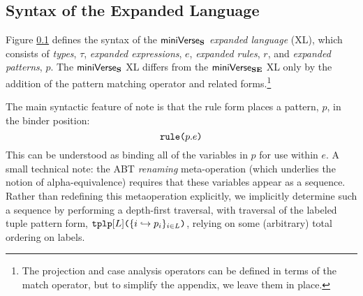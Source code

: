 {{{{\subsection{Syntax of the Expanded Language}\label{sec:UP-expanded-terms}\label{sec:inner-core-syntax-UP}
Figure \ref{sec:UP-expanded-terms} defines the syntax of the $\mathsf{miniVerse}_\textbf{S}$ \emph{expanded language} (XL), which consists of \emph{types}, $\tau$, \emph{expanded expressions}, $e$, \emph{expanded rules}, $r$, and \emph{expanded patterns}, $p$. The $\mathsf{miniVerse}_\textbf{S}$ XL differs from the $\mathsf{miniVerse}_\textbf{SE}$ XL only by the addition of the pattern matching operator and related forms.\footnote{The projection and case analysis operators can be defined in terms of the match operator, but to simplify the appendix, we leave them in place.} %


The main syntactic feature of note is that the rule form places a pattern, $p$, in the binder position:
\[
\texttt{rule}\texttt{(}p.e\texttt{)}
\]
This can be understood as binding all of the variables in $p$ for use within $e$. A small technical note: the ABT \emph{renaming} meta-operation (which underlies the notion of alpha-equivalence) requires that these variables appear as a sequence. Rather than redefining this metaoperation explicitly, we implicitly determine such a sequence by performing a depth-first traversal, with traversal of the labeled tuple pattern form, $\texttt{tplp}[L]\texttt{(}\{i \hookrightarrow p_{i}\}_{i \in L}\texttt{)}$, relying on some (arbitrary) total ordering on labels.

}}}}

